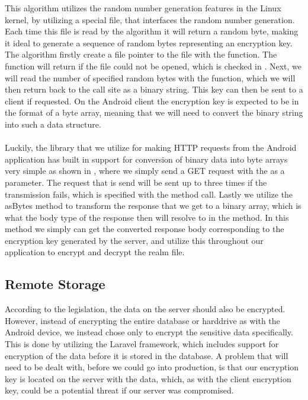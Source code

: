 This algorithm utilizes the random number generation features in the Linux kernel, by utilizing a special file,  that interfaces the random number generation. Each time this file is read by the algorithm it will return a random byte, making it ideal to generate a sequence of random bytes representing an encryption key. The algorithm firstly create a file pointer to the  file with the  function. The function will return  if the file could not be opened, which is checked in . Next, we will read the number of specified random bytes with the  function, which we will then return back to the call site as a binary string. This key can then be sent to a client if requested. On the Android client the encryption key is expected to be in the format of a byte array, meaning that we will need to convert the binary string into such a data structure. 
\\\\
Luckily, the library that we utilize for making HTTP requests from the Android application has built in support for conversion of binary data into byte arrays very simple as shown in , where we simply send a GET request with the  as a parameter. The request that is send will be sent up to three times if the transmission fails, which is specified with the  method call. Lastly we utilize the asBytes method to transform the response that we get to a binary array, which is what the body type of the response then will resolve to in the  method. In this method we simply can get the converted response body corresponding to the encryption key generated by the server, and utilize this throughout our application to encrypt and decrypt the realm file.    

\FloatBarrier

\subsection{Remote Storage}
\label{sub:remote_storage}

According to the legislation, the data on the server should also be encrypted. However, instead of encrypting the entire database or harddrive as with the Android device, we instead chose only to encrypt the sensitive data specifically. This is done by utilizing the Laravel framework, which includes support for encryption of the data before it is stored in the database. A problem that will need to be dealt with, before we could go into production, is that our encryption key is located on the server with the data, which, as with the client encryption key, could be a potential threat if our server was compromised. 
